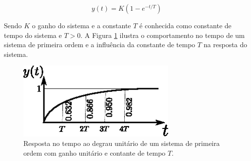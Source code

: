 \begin{equation}
    y(t) = K \left(1 - e^{-t/T} \right)
\end{equation}

Sendo $K$ o ganho do sistema e a constante $T$ é conhecida como constante de tempo do sistema e $T > 0$. A Figura \ref{fig:saida_sistema_primeira_ordem_no_tempo} ilustra o comportamento no tempo de um sistema de primeira ordem e a influência da constante de tempo $T$ na resposta do sistema.

\begin{figure}[H]
    \centering
    \includegraphics[width=0.7\textwidth]{figuras/ilustracoes/resposta_no_tempo_sistema_primeira_ordem.eps}
    \caption{Resposta no tempo ao degrau unitário de um sistema de primeira ordem com ganho unitário e contante de tempo $T$.}
    \label{fig:saida_sistema_primeira_ordem_no_tempo}
\end{figure}

